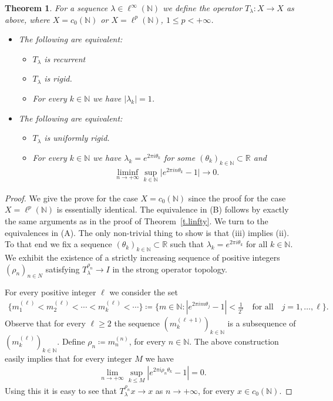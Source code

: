 \documentclass[12pt,leqno]{amsart}
\theoremstyle{plain}
\newtheorem{theorem}[equation]{Theorem}
\theoremstyle{definition}
\numberwithin{equation}{section}
\begin{document}
\begin{theorem}
	For a sequence $\lambda \in \ell^\infty(\mathbb N)$ we define the operator $T_\lambda:X\to X$ as above, where $X=c_0(\mathbb N)$ or $X=\ell^p(\mathbb N)$, $1\leq p<+\infty$. 
	\begin{itemize}
		\item [(A)] The following are equivalent: 
		\begin{itemize}
			\item[(i)] $T_\lambda$ is recurrent 
			\item[(ii)] $T_\lambda$ is rigid. 
			\item[(iii)] For every $k\in\mathbb N$ we have $|\lambda_k|=1$. 
		\end{itemize}
		\item [(B)] The following are equivalent: 
		\begin{itemize}
			\item[(i)] $T_\lambda$ is uniformly rigid. 
			\item[(ii)]For every $k\in\mathbb N$ we have $\lambda_k=e^{2\pi i \theta_k}$ for some $(\theta_k)_{k\in\mathbb N}\subset {\mathbb R}$ and 
			\begin{align*}
				\liminf_{n\to+\infty} \sup_{k\in\mathbb N}{\lvert{e^{2\pi i n \theta_k}-1}\rvert} \to 0. 
			\end{align*}
		\end{itemize}
	\end{itemize}
\end{theorem}

\begin{proof}
	We give the prove for the case $X=c_0(\mathbb N)$ since the proof for the case $X=\ell^p(\mathbb N)$ is essentially identical. The equivalence in (B) follows by exactly the same arguments as in the proof of Theorem~\ref{t.linfty}. We turn to the equivalences in (A). The only non-trivial thing to show is that (iii) implies (ii). To that end we fix a sequence $(\theta_k)_{k\in\mathbb N}\subset {\mathbb R}$ such that $\lambda_k=e^{2\pi i \theta_k}$ for all $k\in \mathbb N$. We exhibit the existence of a strictly increasing sequence of positive integers $(\rho_n)_{n\in N}$ satisfying $T_\lambda ^{\rho_n} \to I$ in the strong operator topology.
	
	For every positive integer $\ell$ we consider the set 
	\begin{align*}
		\{m^{(\ell)} _1 < m^{(\ell)} _2< \cdots < m^{(\ell)} _k <\cdots \}\coloneqq\big\{m\in\mathbb N:|e^{2\pi i m \theta_j}-1|<\frac{1}{2^\ell}\quad\text{for all}\quad j=1,\ldots,\ell\big\}. 
	\end{align*}
	Observe that for every $\ell\geq 2$ the sequence $(m_k ^{(\ell+1)})_{k\in\mathbb N}$ is a subsequence of $(m_k ^{(\ell)})_{k\in\mathbb N}$. Define $\rho_n\coloneqq m_n ^{(n)}$, for every $n\in \mathbb N$. The above construction easily implies that for every integer $M$ we have 
	\begin{align*}
		\lim_{n\to +\infty} \sup_{k\leq M} |e^{2\pi i \rho_n \theta_k }-1| =0. 
	\end{align*}
	Using this it is easy to see that $T_\lambda ^{\rho_n}x\to x$ as $n\to +\infty$, for every $x\in c_0 (\mathbb N)$. 
\end{proof}
\end{document}
